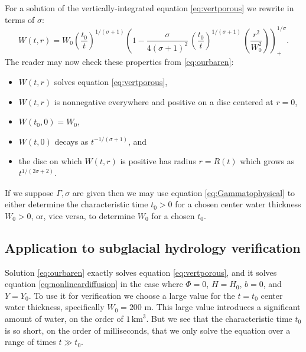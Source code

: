 \documentclass[11pt]{amsart}
\begin{document}
For a solution of the vertically-integrated equation \eqref{eq:vertporous} we rewrite in terms of $\sigma$:
\begin{equation} \label{eq:ourbaren}
  W(t,r) = W_0 \left(\frac{t_0}{t}\right)^{1/(\sigma+1)} \left(1 - \frac{\sigma}{4 (\sigma+1)^2} \,\left(\frac{t_0}{t}\right)^{1/(\sigma+1)} \,\left(\frac{r^2}{W_0^2}\right)\right)_+^{1/\sigma}.
\end{equation}
The reader may now check these properties from \eqref{eq:ourbaren}:\begin{itemize}
\item $W(t,r)$ solves equation \eqref{eq:vertporous},
\item $W(t,r)$ is nonnegative everywhere and positive on a disc centered at $r=0$,
\item $W(t_0,0) = W_0$,
\item $W(t,0)$ decays as $t^{-1/(\sigma+1)}$, and
\item the disc on which $W(t,r)$ is positive has radius $r=R(t)$ which grows as $t^{1/(2\sigma+2)}$.
\end{itemize}

If we suppose $\Gamma,\sigma$ are given then we may use equation \eqref{eq:Gammatophysical} to either determine the characteristic time $t_0>0$ for a chosen center water thickness $W_0>0$, or, vice versa, to determine $W_0$ for a chosen $t_0$.

\subsection*{Application to subglacial hydrology verification}  Solution \eqref{eq:ourbaren} exactly solves equation \eqref{eq:vertporous}, and it solves equation \eqref{eq:nonlineardiffusion} in the case where $\Phi=0$, $H=H_0$, $b=0$, and $Y=Y_0$.  To use it for verification we choose a large value for the $t=t_0$ center water thickness, specifically $W_0=200$ m.  This large value introduces a significant amount of water, on the order of $1\,\text{km}^3$.  But we see that the characteristic time $t_0$ is so short, on the order of milliseconds, that we only solve the equation over a range of times $t\gg t_0$.
\end{document}
